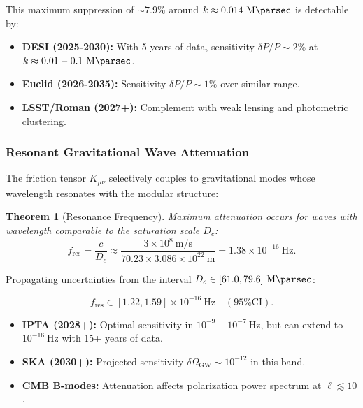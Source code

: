 \documentclass[11pt, a4paper]{article}
\theoremstyle{plain}
\newtheorem{theorem}{Theorem}[section]
\theoremstyle{definition}
\begin{document}
This maximum suppression of $\sim 7.9\%$ around $k \approx 0.014\ \si{\per\mega\parsec}$ is detectable by:

\begin{itemize}
    \item \textbf{DESI (2025-2030):} With 5 years of data, sensitivity $\delta P/P \sim 2\%$ at $k \approx 0.01-0.1\ \si{\per\mega\parsec}$.
    \item \textbf{Euclid (2026-2035):} Sensitivity $\delta P/P \sim 1\%$ over similar range.
    \item \textbf{LSST/Roman (2027+):} Complement with weak lensing and photometric clustering.
\end{itemize}

\subsubsection{Resonant Gravitational Wave Attenuation}

The friction tensor $K_{\mu\nu}$ selectively couples to gravitational modes whose wavelength resonates with the modular structure:

\begin{theorem}[Resonance Frequency]
Maximum attenuation occurs for waves with wavelength comparable to the saturation scale $D_c$:
\begin{equation}
f_{\text{res}} = \frac{c}{D_c} \approx \frac{3\times 10^8\ \si{\meter\per\second}}{70.23 \times 3.086\times 10^{22}\ \si{\meter}} = 1.38 \times 10^{-16}\ \si{\hertz}.
\end{equation}
\end{theorem}

Propagating uncertainties from the interval $D_c \in [61.0, 79.6]\ \si{\mega\parsec}$:

\begin{equation}
f_{\text{res}} \in [1.22, 1.59] \times 10^{-16}\ \si{\hertz} \quad (\text{95\% CI}).
\end{equation}

\begin{itemize}
    \item \textbf{IPTA (2028+):} Optimal sensitivity in $10^{-9}-10^{-7}\ \si{\hertz}$, but can extend to $10^{-16}\ \si{\hertz}$ with 15+ years of data.
    \item \textbf{SKA (2030+):} Projected sensitivity $\delta\Omega_{\text{GW}} \sim 10^{-12}$ in this band.
    \item \textbf{CMB B-modes:} Attenuation affects polarization power spectrum at $\ell \lesssim 10$.
\end{itemize}
\end{document}
